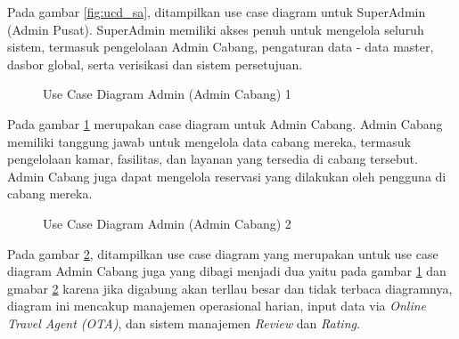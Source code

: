Pada gambar \ref{fig:ucd_sa}, ditampilkan use case diagram untuk SuperAdmin (Admin Pusat). SuperAdmin memiliki akses penuh untuk mengelola seluruh sistem, termasuk pengelolaan Admin Cabang, pengaturan data - data master, dasbor global, serta verisikasi dan sistem persetujuan.

\begin{figure}[H] %
    \centering
    \caption{Use Case Diagram Admin (Admin Cabang) 1}
    \label{fig:ucd_admin1} %
\end{figure}

Pada gambar \ref{fig:ucd_admin1} merupakan case diagram untuk Admin Cabang. Admin Cabang memiliki tanggung jawab untuk mengelola data cabang mereka, termasuk pengelolaan kamar, fasilitas, dan layanan yang tersedia di cabang tersebut. Admin Cabang juga dapat mengelola reservasi yang dilakukan oleh pengguna di cabang mereka.

\begin{figure}[H] %
    \centering
    \caption{Use Case Diagram Admin (Admin Cabang) 2}
    \label{fig:ucd_admin2} %
\end{figure}

Pada gambar \ref{fig:ucd_admin2}, ditampilkan use case diagram yang merupakan untuk use case diagram Admin Cabang juga yang dibagi menjadi dua yaitu pada gambar \ref{fig:ucd_admin1} dan gmabar \ref{fig:ucd_admin2} karena jika digabung akan terllau besar dan tidak terbaca diagramnya, diagram ini mencakup manajemen operasional harian, input data via \textit{Online Travel Agent (OTA)}, dan sistem manajemen \textit{Review} dan \textit{Rating}.

